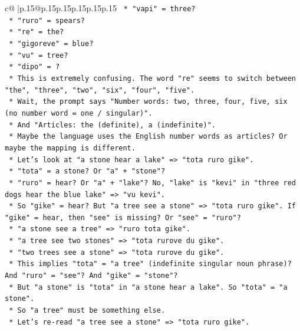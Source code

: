 \documentclass{article}
\begin{document}
{\begin{supertabular}{c@{$\;$}|p{.15\linewidth}@{}p{.15\linewidth}p{.15\linewidth}p{.15\linewidth}p{.15\linewidth}p{.15\linewidth}}
{{{\texttt{                *   "vapi" = three?} \\
\texttt{                *   "ruro" = spears?} \\
\texttt{                *   "re" = the?} \\
\texttt{                *   "gigoreve" = blue?} \\
\texttt{                *   "vu" = tree?} \\
\texttt{                *   "dipo" = ?} \\
\texttt{            *   This is extremely confusing. The word "re" seems to switch between "the", "three", "two", "six", "four", "five".} \\
\texttt{            *   Wait, the prompt says "Number words: two, three, four, five, six (no number word = one / singular)".} \\
\texttt{            *   And "Articles: the (definite), a (indefinite)".} \\
\texttt{            *   Maybe the language uses the English number words as articles? Or maybe the mapping is different.} \\
\texttt{            *   Let's look at "a stone hear a lake" => "tota ruro gike".} \\
\texttt{                *   "tota" = a stone? Or "a" + "stone"?} \\
\texttt{                *   "ruro" = hear? Or "a" + "lake"? No, "lake" is "kevi" in "three red dogs hear the blue lake" => "vu kevi".} \\
\texttt{                *   So "gike" = hear? But "a tree see a stone" => "tota ruro gike". If "gike" = hear, then "see" is missing? Or "see" = "ruro"?} \\
\texttt{                *   "a stone see a tree" => "ruro tota gike".} \\
\texttt{                *   "a tree see two stones" => "tota rurove du gike".} \\
\texttt{                *   "two trees see a stone" => "tota rurove du gike".} \\
\texttt{                *   This implies "tota" = "a tree" (indefinite singular noun phrase)? And "ruro" = "see"? And "gike" = "stone"?} \\
\texttt{                *   But "a stone" is "tota" in "a stone hear a lake". So "tota" = "a stone".} \\
\texttt{                *   So "a tree" must be something else.} \\
\texttt{                *   Let's re{-}read "a tree see a stone" => "tota ruro gike".} \\
}}}
\end{supertabular}}
\end{document}
